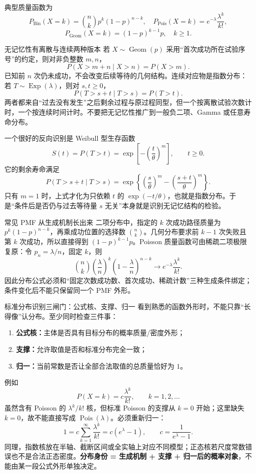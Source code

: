 \documentclass[11pt,a4paper]{ctexart}
\newcommand{\kw}[1]{\textbf{\color{deep}#1}}
\begin{document}
典型质量函数为
\[
P_{\operatorname{Bin}}(X=k)=\binom nkp^k(1-p)^{n-k},\quad
P_{\operatorname{Pois}}(X=k)=e^{-\lambda}\frac{\lambda^k}{k!},
\]
\[
P_{\operatorname{Geom}}(X=k)=(1-p)^{k-1}p,\quad k\ge1.
\]

\begin{methodbox}{无记忆性有离散与连续两种版本}
若 $X\sim\operatorname{Geom}(p)$ 采用“首次成功所在试验序号”的约定，则对非负整数 $m,n$，
\[
\boxed{P(X>m+n\mid X>n)=P(X>m)}.
\]
已知前 $n$ 次仍未成功，不会改变后续等待的几何结构。连续对应物是指数分布：若 $T\sim\operatorname{Exp}(\lambda)$，则对 $s,t\ge0$，
\[
\boxed{P(T>s+t\mid T>s)=P(T>t)}.
\]
两者都来自“过去没有发生”之后剩余过程与原过程同型，但一个按离散试验次数计时，一个按连续时间计时。不要把无记忆性推广到一般负二项、Gamma 或任意寿命分布。

一个很好的反向识别是 Weibull 型生存函数
\[
S(t)=P(T>t)=\exp\!\left[-\left(\frac{t}{\theta}\right)^m\right],\qquad t\ge0.
\]
它的剩余寿命满足
\[
P(T>s+t\mid T>s)
=\exp\!\left\{\left(\frac{s}{\theta}\right)^m-\left(\frac{s+t}{\theta}\right)^m\right\}.
\]
只有 $m=1$ 时，上式才化为只依赖 $t$ 的 $\exp(-t/\theta)$，也就是指数分布。于是“条件后是否仍与过去等待量 $s$ 无关”本身就是识别无记忆结构的检验。
\end{methodbox}

\begin{methodbox}{常见 PMF 从生成机制长出来}
二项分布中，指定的 $k$ 次成功路径质量为 $p^k(1-p)^{n-k}$，再乘成功位置的选择数 $\binom nk$。几何分布要求前 $k-1$ 次失败且第 $k$ 次成功，所以直接得到 $(1-p)^{k-1}p$。Poisson 质量函数可由稀疏二项极限复原：令 $p_n=\lambda/n$，固定 $k$，则
\[
\binom nk\left(\frac\lambda n\right)^k
\left(1-\frac\lambda n\right)^{n-k}
\longrightarrow e^{-\lambda}\frac{\lambda^k}{k!}.
\]
因此分布公式必须和“固定次数成功数、首次成功、稀疏计数”三种生成条件绑定；条件变化后不能只保留同一个 PMF 外形。
\end{methodbox}

\begin{methodbox}{标准分布识别三闸门：公式核、支撑、归一}
看到熟悉的函数外形时，不能只靠“长得像”认分布。至少同时检查三件事：
\begin{enumerate}
  \item \kw{公式核：}主体是否具有目标分布的概率质量/密度外形；
  \item \kw{支撑：}允许取值是否和标准分布完全一致；
  \item \kw{归一：}当前常数是否让全部合法取值的总质量恰好为 $1$。
\end{enumerate}
例如
\[
P(X=k)=c\frac{\lambda^k}{k!},\qquad k=1,2,\ldots
\]
虽然含有 Poisson 的 $\lambda^k/k!$ 核，但标准 Poisson 的支撑从 $k=0$ 开始；这里缺失 $k=0$，故不能直接写成 $\operatorname{Pois}(\lambda)$。必须重新归一：
\[
1=c\sum_{k=1}^{\infty}\frac{\lambda^k}{k!}
=c(e^\lambda-1),
\qquad
c=\frac1{e^\lambda-1}.
\]
同理，指数核放在半轴、截断区间或全实轴上对应不同模型；正态核若尺度常数错误也不是合法正态密度。\kw{分布身份 = 生成机制 + 支撑 + 归一后的概率对象}，不能由某一段公式外形单独决定。
\end{methodbox}
\end{document}
